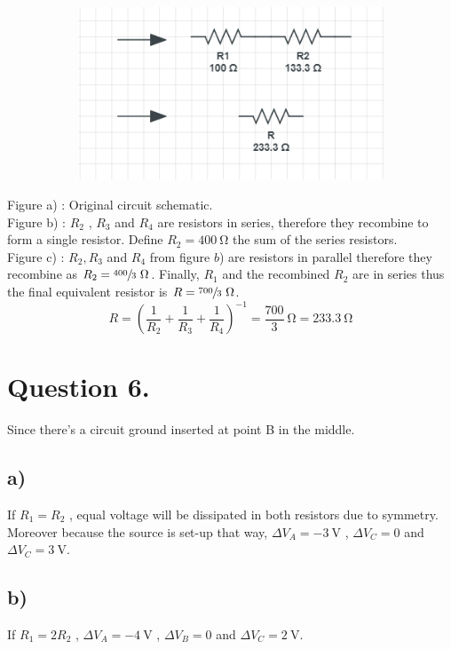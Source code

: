 \documentclass[
	12pt,
	]{article}
\theoremstyle{definition}
\theoremstyle{definition}
\theoremstyle{definition}
\theoremstyle{definition}
\theoremstyle{definition}
\theoremstyle{example}
\theoremstyle{note}
\theoremstyle{remark}
\theoremstyle{example}
\begin{document}
\begin{figure}[htp]
\begin{subfigure}[h]{0.3\textwidth}
		 		\caption{}
		 	\end{subfigure}
		 	\hfill
		 	\begin{subfigure}[h]{0.3\textwidth}
		 		\includegraphics[width=\textwidth]{phys241_ass1_f3.png}
		 		\caption{}
		 	\end{subfigure}
		 \end{figure}
	Figure a) : Original circuit schematic.\\
		 Figure b) : $R_{2}$ , $R_{3}$ and $R_{4}$ are resistors in series, therefore they recombine to form a single resistor. Define $R_{2} = 400 \ \si{\ohm}$ the sum of the series resistors. \\
		 Figure c) :  $R_{2} , R_{3}$ and $R_{4}$ from figure $b$) are resistors in parallel therefore they recombine as $R_{2} = \sfrac{400}{3} \ \si{\ohm}$. Finally, $R_{1}$ and the recombined $R_{2}$ are in series thus the final equivalent resistor is $R= \sfrac{700}{3} \ \si{\ohm}$.
		  $$ R = \left(\frac{1}{R_{2}} + \frac{1}{R_{3}} + \frac{1}{R_{4}}\right)^{-1} = \frac{700}{3} \ \si{\ohm} = 233. 3 \ \si{\ohm}$$
		  \section{Question 6.}
		  Since there's a circuit ground inserted at point B in the middle.
		  \subsection{a) } 
		  	If $R_{1} = R_{2}$ , equal voltage will be dissipated in both resistors due to symmetry. Moreover because the source is set-up that way, $\Delta V_{A} = - 3 \ \si{\volt}$ , $\Delta V_{C} = 0 $ and $\Delta V_{C} = 3 \ \si{\volt}$.
		  	\subsection{b) }
		  	If $R_{1} = 2R_{2}$ , $\Delta V_{A} = -4 \ \si{\volt}$ , $\Delta V_{B} = 0 $ and $\Delta V_{C} = 2 \ \si{\volt}$. 
\end{document}
